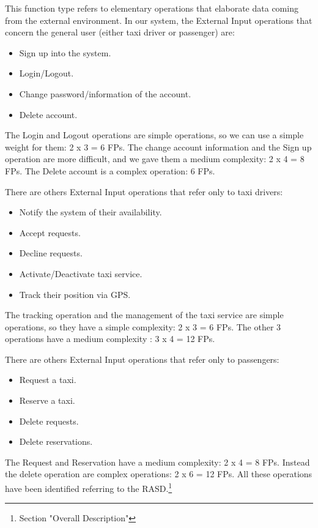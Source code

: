 This function type refers to elementary operations that elaborate data coming from the external environment.
\newline
In our system, the External Input operations that concern the general user (either taxi driver or passenger) are:
\begin{itemize}
    \item Sign up into the system. 
	\item Login/Logout.
	\item Change password/information of the account. 
	\item Delete account. 
\end{itemize}
The Login and Logout operations are simple operations, so we can use a simple weight for them: 2 x 3 = 6 FPs. The change account information and the Sign up operation are more difficult, and we gave them a medium complexity: 2 x 4 = 8 FPs.
The Delete account is a complex operation: 6 FPs.
\newline

There are others External Input operations that refer only to taxi drivers:
\begin{itemize}
	\item Notify the system of their availability. 
	\item Accept requests. 
	\item Decline requests. 
	\item Activate/Deactivate taxi service. 
	\item Track their position via GPS. 
\end{itemize}
The tracking operation and the management of the taxi service are simple operations, so they have a simple complexity: 2 x 3 = 6 FPs.
The other 3 operations have a medium complexity : 3 x 4 = 12 FPs.
\newline

There are others External Input operations that refer only to passengers:
\begin{itemize}
	\item Request a taxi. 
	\item Reserve a taxi. 
	\item Delete requests. 
	\item Delete reservations. 
\end{itemize}
The Request and Reservation have a medium complexity: 2 x 4 = 8 FPs. Instead the delete operation are complex operations: 2 x 6 = 12 FPs.
\newline
All these operations have been identified referring to the RASD.\footnote{Section "Overall Description"}